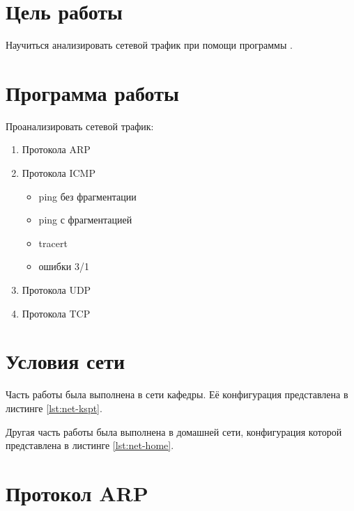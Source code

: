 





\tableofcontents
\listoffigures
\listoftables
\newpage

\section{Цель работы}

Научиться анализировать сетевой трафик при помощи программы .

\section{Программа работы}

Проанализировать сетевой трафик:

\begin{enumerate}
	\item Протокола ARP
	\item Протокола ICMP
	\begin{itemize}
		\item ping без фрагментации
		\item ping с фрагментацией
		\item tracert
		\item ошибки 3/1
	\end{itemize}
	\item Протокола UDP
	\item Протокола TCP
\end{enumerate}

\section{Условия сети}

Часть работы была выполнена в сети кафедры. Её конфигурация представлена в листинге \ref{lst:net-kspt}.




Другая часть работы была выполнена в домашней сети, конфигурация которой представлена в листинге \ref{lst:net-home}.



\section{Протокол ARP}

